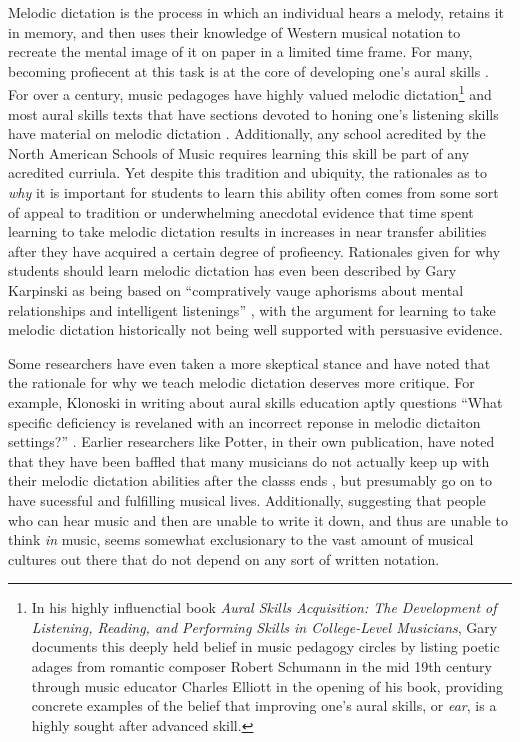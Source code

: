 \documentclass[]{book}
\let\rmarkdownfootnote\footnote%
\def\footnote{\protect\rmarkdownfootnote}
\theoremstyle{definition}
\theoremstyle{definition}
\theoremstyle{definition}
\theoremstyle{remark}
\begin{document}
Melodic dictation is the process in which an individual hears a melody,
retains it in memory, and then uses their knowledge of Western musical
notation to recreate the mental image of it on paper in a limited time
frame. For many, becoming profiecent at this task is at the core of
developing one's aural skills \citep{karpinskiModelMusicPerception1990}.
For over a century, music pedagoges have highly valued melodic
dictation\footnote{In his highly influenctial book \emph{Aural Skills
  Acquisition: The Development of Listening, Reading, and Performing
  Skills in College-Level Musicians}, Gary
  \citet{karpinskiAuralSkillsAcquisition2000} documents this deeply held
  belief in music pedagogy circles by listing poetic adages from
  romantic composer Robert Schumann in the mid 19th century through
  music educator Charles Elliott in the opening of his book, providing
  concrete examples of the belief that improving one's aural skills, or
  \emph{ear}, is a highly sought after advanced skill. } and most aural
skills texts that have sections devoted to honing one's listening skills
have material on melodic dictation
\citep{karpinskiAuralSkillsAcquisition2000}. Additionally, any school
acredited by the North American Schools of Music requires learning this
skill be part of any acredited curriula. Yet despite this tradition and
ubiquity, the rationales as to \emph{why} it is important for students
to learn this ability often comes from some sort of appeal to tradition
or underwhelming anecdotal evidence that time spent learning to take
melodic dictation results in increases in near transfer abilities after
they have acquired a certain degree of profieency. Rationales given for
why students should learn melodic dictation has even been described by
Gary Karpinski as being based on ``compratively vauge aphorisms about
mental relationships and intelligent listenings''
\citep[p.192]{karpinskiModelMusicPerception1990}, with the argument for
learning to take melodic dictation historically not being well supported
with persuasive evidence.

Some researchers have even taken a more skeptical stance and have noted
that the rationale for why we teach melodic dictation deserves more
critique. For example, Klonoski in writing about aural skills education
aptly questions ``What specific deficiency is revelaned with an
incorrect reponse in melodic dictaiton settings?''
\citep{klonoskiImprovingDictationAuralSkills2006}. Earlier researchers
like Potter, in their own publication, have noted that they have been
baffled that many musicians do not actually keep up with their melodic
dictation abilities after the classs ends
\citep{potterIdentifyingSucessfulDictation1990}, but presumably go on to
have sucessful and fulfilling musical lives. Additionally, suggesting
that people who can hear music and then are unable to write it down, and
thus are unable to think \emph{in} music, seems somewhat exclusionary to
the vast amount of musical cultures out there that do not depend on any
sort of written notation.
\end{document}
